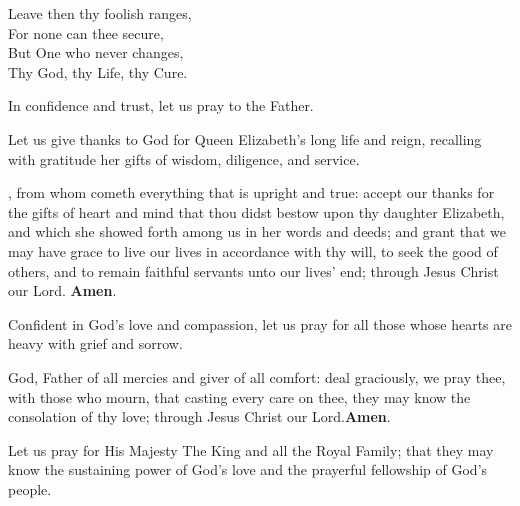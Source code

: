 \begin{center}
	Leave then thy foolish ranges,\\
For none can thee secure,\\
But One who never changes,\\
Thy God, thy Life, thy Cure.\\
\end{center}






In confidence and trust, let us pray to the Father.




Let us give thanks to God for Queen Elizabeth’s long life and reign, recalling with
gratitude her gifts of wisdom, diligence, and service.

, from whom cometh everything that is upright and true: accept our thanks
for the gifts of heart and mind that thou didst bestow upon thy daughter
Elizabeth, and which she showed forth among us in her words and deeds; and grant that
we may have grace to live our lives in accordance with thy will, to seek the good of
others, and to remain faithful servants unto our lives’ end; through Jesus Christ our
Lord. \textbf{Amen}.



Confident in God’s love and compassion, let us pray for all those whose hearts are heavy
with grief and sorrow.

 God, Father of all mercies and giver of all comfort: deal graciously,
we pray thee, with those who mourn, that casting every care on thee, they may
know the consolation of thy love; through Jesus Christ our Lord.\textbf{Amen}.



Let us pray for His Majesty The King and all the Royal Family; that they may know the
sustaining power of God’s love and the prayerful fellowship of God’s people.

